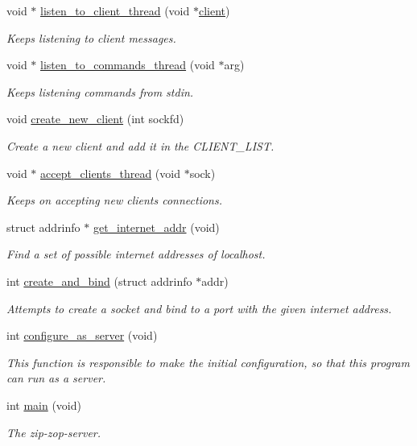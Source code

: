 \begin{DoxyCompactItemize}
void $\ast$ \hyperlink{zip-zop-server_8c_abb42bd69f5e5088fef8519780a977f98}{listen\+\_\+to\+\_\+client\+\_\+thread} (void $\ast$\hyperlink{structclient}{client})
\begin{DoxyCompactList}\small\item\em Keeps listening to client messages. \end{DoxyCompactList}\item 
void $\ast$ \hyperlink{zip-zop-server_8c_aecc6f61fca90c0a9fa8093c7cc0eb687}{listen\+\_\+to\+\_\+commands\+\_\+thread} (void $\ast$arg)
\begin{DoxyCompactList}\small\item\em Keeps listening commands from stdin. \end{DoxyCompactList}\item 
void \hyperlink{zip-zop-server_8c_ab9a14cd690eac9781dd224e034fbd01d}{create\+\_\+new\+\_\+client} (int sockfd)
\begin{DoxyCompactList}\small\item\em Create a new client and add it in the {\ttfamily C\+L\+I\+E\+N\+T\+\_\+\+L\+I\+ST}. \end{DoxyCompactList}\item 
void $\ast$ \hyperlink{zip-zop-server_8c_aebe94d23e0b61c3ffd1df3a19071fb4b}{accept\+\_\+clients\+\_\+thread} (void $\ast$sock)
\begin{DoxyCompactList}\small\item\em Keeps on accepting new clients connections. \end{DoxyCompactList}\item 
struct addrinfo $\ast$ \hyperlink{zip-zop-server_8c_a2d9748875d07382b9dbecb97c6cd9b62}{get\+\_\+internet\+\_\+addr} (void)
\begin{DoxyCompactList}\small\item\em Find a set of possible internet addresses of localhost. \end{DoxyCompactList}\item 
int \hyperlink{zip-zop-server_8c_a0ecdeaf556729d827a07915b7a89866c}{create\+\_\+and\+\_\+bind} (struct addrinfo $\ast$addr)
\begin{DoxyCompactList}\small\item\em Attempts to create a socket and bind to a port with the given internet address. \end{DoxyCompactList}\item 
int \hyperlink{zip-zop-server_8c_a59ee6eb284b065353164c1aa7d487ce2}{configure\+\_\+as\+\_\+server} (void)
\begin{DoxyCompactList}\small\item\em This function is responsible to make the initial configuration, so that this program can run as a server. \end{DoxyCompactList}\item 
int \hyperlink{zip-zop-server_8c_a840291bc02cba5474a4cb46a9b9566fe}{main} (void)
\begin{DoxyCompactList}\small\item\em The zip-\/zop-\/server. \end{DoxyCompactList}\end{DoxyCompactItemize}
